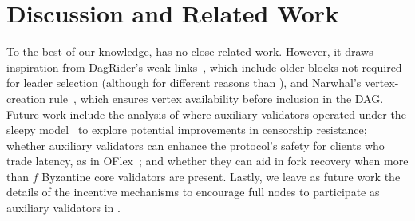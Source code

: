 \section{Discussion and Related Work} \label{sec:related}
To the best of our knowledge, \sysname has no close related work. However, it draws inspiration from DagRider's weak links~\cite{dag-rider}, which include older blocks not required for leader selection (although for different reasons than \sysname), and Narwhal's vertex-creation rule~\cite{narwhal}, which ensures vertex availability before inclusion in the DAG.
%
Future work include the analysis of \sysname where auxiliary validators operated under the sleepy model~\cite{pass2017sleepy} to explore potential improvements in censorship resistance; whether auxiliary validators can enhance the protocol's safety for clients who trade latency, as in OFlex~\cite{malkhi2019flexible, oflex}; and whether they can aid in fork recovery when more than $f$ Byzantine core validators are present. Lastly, we leave as future work the details of the incentive mechanisms to encourage full nodes to participate as auxiliary validators in \sysname.